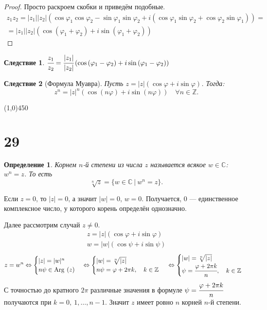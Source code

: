\documentclass[a4paper,12pt]{article}
\newcommand{\Arg}{\mathrm{Arg\:}}
\newtheorem*{Def}{Определение}
\newtheorem*{Consequence}{Следствие}
\begin{document}
	\begin{proof}
		Просто раскроем скобки и приведём подобные.
		\begin{gather*}
		z_1z_2 = |z_1||z_2|\left(\cos\varphi_1\cos\varphi_2-\sin\varphi_1\sin\varphi_2 + i\left(\cos\varphi_1\sin\varphi_2+\cos\varphi_2\sin\varphi_1\right)\right) = \\ =|z_1||z_2|\left(\cos\left(\varphi_1 + \varphi_2\right) + i\sin\left(\varphi_1 + \varphi_2\right)\right)
		\end{gather*}
	\end{proof}
	
	\begin{Consequence}
		$\cfrac{z_1}{z_2} = \cfrac{|z_1|}{|z_2|}\left(\cos\left(\varphi_1-\varphi_2\right) + i\sin\left(\varphi_1 - \varphi_2\right)\right)$
	\end{Consequence}
	
	\begin{Consequence}[Формула Муавра]
		Пусть $z = |z|\left(\cos\varphi + i \sin \varphi\right)$. Тогда:
		\[z^n = |z|^n\left(\cos\left(n\varphi\right)+i\sin\left(n\varphi\right)\right) \quad \forall n \in \mathbb{Z}.
		\]
	\end{Consequence}
	
	\begin{center}
		\line(1,0){450}
	\end{center}
	\section*{29}
	\begin{Def}
		Корнем $n$-й степени из числа $z$ называется всякое $w\in\mathbb C$: $w^n=z$. То есть
		\[
		\sqrt[n]{z} = \{w\in\mathbb C\ |\ w^n = z\}.
		\]
	\end{Def}
	Если $z=0$, то $|z| = 0$, а значит $|w| = 0$, $w=0$. Получается, 0 --- единственное комплексное число, у которого корень определён однозначно. 
	
	Далее рассмотрим случай $z \neq 0$. 
	\begin{gather*}
	z = |z|\left(\cos\varphi+i\sin\varphi\right)\\
	w = |w|\left(\cos\psi+i\sin\psi\right)
	\end{gather*}
	\[
	z = w^n \Leftrightarrow
	\begin{cases}
	|z| = |w|^n \\
	n\psi\in\Arg\left(z\right)
	\end{cases}
	\Leftrightarrow
	\begin{cases}
	|w|= \sqrt[n]{|z|}\\
	n\psi= \varphi+2\pi k,\quad k\in \mathbb Z
	\end{cases}\\
	\Leftrightarrow
	\begin{cases}
	|w|=\sqrt[n]{|z|}\\
	\psi = \cfrac{\varphi+2\pi k}{n},\quad k \in \mathbb{Z}
	\end{cases}
	\]
	С точностью до кратного $2\pi$ различные значения в формуле $\psi = \cfrac{\varphi+2\pi k }{n}$ получаются при $k = 0,\ 1,\ldots,n-1$. Значит $z$ имеет ровно $n$ корней $n$-й степени. 
	
\end{document}
